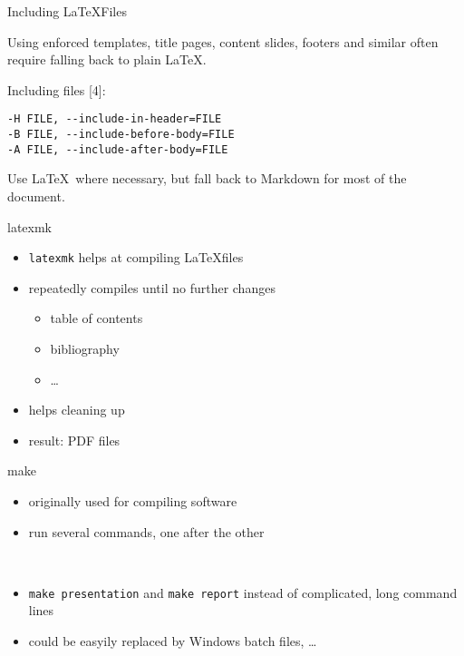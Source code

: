 \documentclass[smaller,ignorenonframetext,]{beamer}
\begin{document}
\begin{frame}[fragile]{Including \LaTeX Files}

Using enforced templates, title pages, content slides, footers and
similar often require falling back to plain \LaTeX.

Including files {[}4{]}:

\begin{lstlisting}
-H FILE, --include-in-header=FILE
-B FILE, --include-before-body=FILE
-A FILE, --include-after-body=FILE
\end{lstlisting}

Use \LaTeX~where necessary, but fall back to Markdown for most of the
document.

\end{frame}

\begin{frame}[fragile]{latexmk}

\begin{itemize}
\itemsep1pt\parskip0pt
\item
  \lstinline!latexmk! helps at compiling \LaTeX files
\item
  repeatedly compiles until no further changes

  \begin{itemize}
  \itemsep1pt\parskip0pt
  \item
    table of contents
  \item
    bibliography
  \item
    \dots
  \end{itemize}
\item
  helps cleaning up
\item
  result: PDF files
\end{itemize}

\end{frame}

\begin{frame}[fragile]{make}

\begin{itemize}
\itemsep1pt\parskip0pt
\item
  originally used for compiling software
\item
  run several commands, one after the other
\end{itemize}

~

\begin{itemize}
\itemsep1pt\parskip0pt
\item
  \lstinline!make presentation! and \lstinline!make report! instead of
  complicated, long command lines
\item
  could be easyily replaced by Windows batch files, \dots
\end{itemize}

\end{frame}
\end{document}
